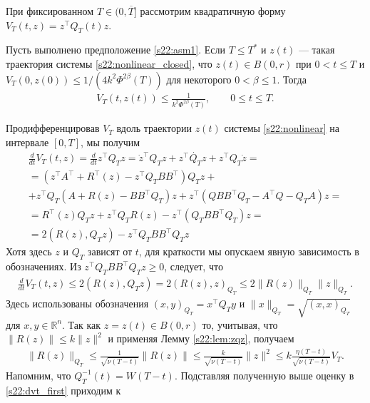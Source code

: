 \documentclass[../main.tex]{subfiles}
\begin{document}
При фиксированном $T\in (0, \overline{T}]$ рассмотрим квадратичную форму $V_T(t,z)=z^{\top}Q_T(t)z$. 
\begin{lemma}\label{s22:lem:vest}
 Пусть выполнено предположение \ref{s22:asm1}. 
Если $T\leqslant T^*$ и $z(t)$ --- такая траектория системы \eqref{s22:nonlinear_closed}, что $z(t) \in B(0,r)$ при $0<t \leqslant T$ и $V_T(0,z(0))\leqslant 1/(4k^2\Phi^{2\beta}(T))$ для некоторого $0<\beta \leqslant 1$. 
 Тогда 
 \begin{gather*}
 V_T(t,z(t)) \leqslant \frac{1}{k^2\Phi^{2\beta}(T)}, \qquad 0 \leqslant t \leqslant T. 
 \end{gather*}
\end{lemma}
\doc 
Продифференцировав $V_T$ вдоль траектории $z(t)$ системы \eqref{s22:nonlinear} на интервале $[0, T]$, мы получим
\begin{gather*}
 \frac{d}{dt}V_T(t,z) = \frac{d}{dt}z^{\top}Q_Tz = \dot{z}^{\top} Q_T z + z^{\top} \dot{Q_T} z + z^{\top} Q_T \dot{z} = \\
 =\left(z^{\top} A^{\top} + R^{\top}(z)- z^{\top} Q_T B B^{\top}\right) Q_T z + \\ +
 z^{\top} Q_T \left(A +R(z) - B B^{\top} Q_T\right)z + z^{\top} \left(Q B B^{\top} Q_T - A^{\top}Q - Q_T A \right) z = \\
 = R^{\top}(z)Q_T z + z^{\top} Q_T R(z) - z^{\top} (Q_T B B^{\top} Q_T) z = \\
 = 2 \left( R(z), Q_Tz \right) - z^{\top} Q_T B B^{\top} Q_T z 
\end{gather*}
Хотя здесь $z$ и $Q_T$ зависят от $t$, для краткости мы опускаем явную зависимость в обозначениях. 
Из $z^{\top} Q_T B B^{\top} Q_T z\geqslant 0$, следует, что
\begin{gather}\label{s22:dvt_first}
 \frac{d}{dt}V_T(t,z) \leqslant 2 \left( R(z), Q_T z\right)=2(R(z),z)_{Q_T} \leqslant 2 \| R(z) \|_{Q_T} \| z \|_{Q_T}.
\end{gather}
Здесь использованы обозначения $(x,y)_{Q_T}=x^\top Q_Ty$ и $\| x \|_{Q_T} =\sqrt{(x,x)_{Q_T}}$ для $x,y\in \mathbb R^n$. 
Так как $z = z(t) \in B(0,r)$ то, учитывая, что $\|R(z)\| \leqslant k\|z\|^2$ и применяя Лемму \ref{s22:lem:zqz}, получаем 
\begin{gather}\label{s22:rqr_est}
 \| R(z) \|_{Q_T} \leqslant \frac{1}{\sqrt{\nu(T - t)}} \|R(z)\| \leqslant \frac{k}{\sqrt{\nu(T - t)}}\|z\|^2 \leqslant k \frac{\eta(T-t)}{\sqrt{\nu(T-t)}}V_T.
\end{gather}
Напомним, что $ Q_T^{-1}(t) = W(T-t) $.
Подставляя полученную выше оценку в \eqref{s22:dvt_first} приходим к
\end{document}
